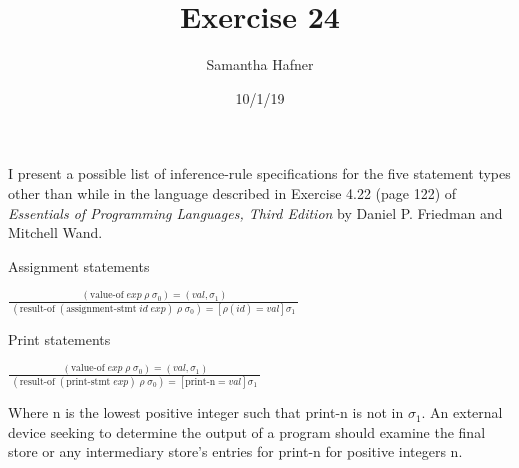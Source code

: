 \documentclass[12pt]{article}
\title{Exercise 24}
\author{Samantha Hafner}
\date{10/1/19}
\begin{document}
\maketitle

\newcommand\IR[2]{\frac{\displaystyle #1}{\displaystyle #2}}
\newcommand\VOE[5]{(\textrm{value-of}\;#1 \;\rho#2 \;\sigma#3 )=(#4,\sigma#5)}
\newcommand\ROE[5]{(\textrm{result-of}\;#1 \;\rho#2 \;\sigma#3 )=#4\sigma#5}
\newcommand\RO[3]{(\textrm{result-of}\;#1 \;\rho#2 \;\sigma#3 )}

I present a possible list of inference-rule specifications for the five statement types other than while in the language described in Exercise 4.22 (page 122) of \textit{Essentials of Programming Languages, Third Edition} by Daniel P. Friedman and Mitchell Wand.

\vspace{25px}
{\setlength{\parindent}{0px}
Assignment statements

\vspace{10px}
$\IR{\
  \VOE{exp}{}{_0}{val}{_1}
}{\
  \ROE{(\textrm{assignment-stmt}\;id\;exp)}{}{_0}{[\rho(id)=val]}{_1}\
}$

\vspace{25px}
Print statements

\vspace{10px}
$\IR{\
  \VOE{exp}{}{_0}{val}{_1}
}{\
  \ROE{(\textrm{print-stmt}\;exp)}{}{_0}{[\textrm{print-n}=val]}{_1}\
}$
}

\vspace{5px}
Where n is the lowest positive integer such that print-n is not in $\sigma_1$. An external device seeking to determine the output of a program should examine the final store or any intermediary store's entries for print-n for positive integers n.
\end{document}
